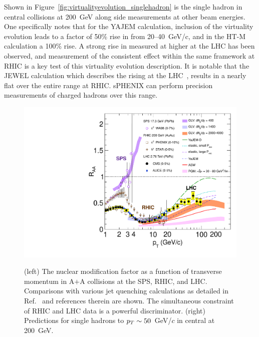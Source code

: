 Shown in Figure~\ref{fig:virtualityevolution_singlehadron} is the
single hadron \raa in central \auau collisions at 200~GeV along
side measurements at other beam energies.  One specifically notes that
for the YAJEM calculation, inclusion of the virtuality evolution leads
to a factor of 50\% rise in \raa from 20--40~GeV/c, and in the HT-M
calculation a 100\% rise. A strong rise in \raa measured at
higher \pt at the LHC has been observed, and measurement of the
consistent effect within the same framework at RHIC is a key test of
this virtuality evolution description. It is notable that the JEWEL
calculation which describes the rising \raa at the
LHC~\cite{Zapp:2013vla}, results in a nearly flat \raa over the entire
\pt range at RHIC. sPHENIX can perform precision measurements of
charged hadrons over this \pt range.

\begin{figure}[!hbt]
 \begin{center}
   \includegraphics[width=0.43\linewidth]{figs/raa_compiled_QM11_square_hi2011}
   \caption[ The nuclear modification factor \raa vs transverse
   momentum at the SPS, RHIC, and LHC, compared to various jet
   quenching calculations]{(left) The nuclear modification factor \raa
     as a function of transverse momentum in A$+$A collisions at the
     SPS, RHIC, and LHC.  Comparisons with various jet quenching
     calculations as detailed in Ref.~\cite{CMS:2012aa} and references
     therein are shown.  The simultaneous constraint of RHIC and LHC
     data is a powerful discriminator. (right) Predictions for single
     hadrons \raa to $\mbox{${p_T}$}\sim50$~GeV/$c$ in central \auau at 200~GeV.}
  \label{fig:virtualityevolution_singlehadron}
  \label{fig:cmsqhat}
 \end{center}
\end{figure}

